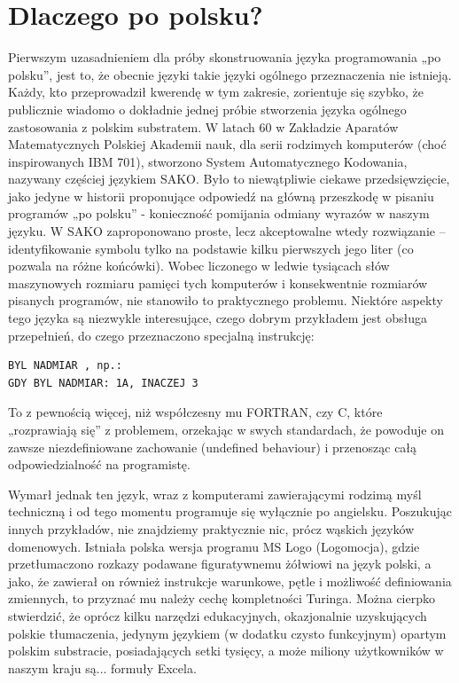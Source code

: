 \section{Dlaczego po polsku?}
Pierwszym uzasadnieniem dla próby skonstruowania języka programowania „po polsku”, jest to, że obecnie języki takie języki ogólnego przeznaczenia nie istnieją. Każdy, kto przeprowadził kwerendę w tym zakresie, zorientuje się szybko, że publicznie wiadomo o dokładnie jednej próbie stworzenia języka ogólnego zastosowania z polskim substratem.%
W latach 60 w Zakładzie Aparatów Matematycznych Polskiej Akademii nauk, dla serii rodzimych komputerów (choć inspirowanych IBM 701), stworzono System Automatycznego Kodowania, nazywany częściej językiem SAKO\cite{SAKO}. Było to niewątpliwie ciekawe przedsięwzięcie, jako jedyne w historii proponujące odpowiedź na główną przeszkodę w pisaniu programów „po polsku” - konieczność pomijania odmiany wyrazów w naszym języku. W SAKO zaproponowano proste, lecz akceptowalne wtedy rozwiązanie – identyfikowanie symbolu tylko na podstawie kilku pierwszych jego liter (co pozwala na różne końcówki). Wobec liczonego w ledwie tysiącach słów maszynowych rozmiaru pamięci tych komputerów i konsekwentnie rozmiarów pisanych programów, nie stanowiło to praktycznego problemu.
Niektóre aspekty tego języka są niezwykle interesujące, czego dobrym przykładem jest obsługa przepełnień, do czego przeznaczono specjalną instrukcję:
\begin{lstlisting}
BYL NADMIAR , np.:
GDY BYL NADMIAR: 1A, INACZEJ 3 
\end{lstlisting}
To z pewnością więcej, niż współczesny mu FORTRAN, czy C, które „rozprawiają się” z problemem, orzekając w swych standardach, że powoduje on zawsze niezdefiniowane zachowanie (undefined behaviour) i przenosząc całą odpowiedzialność na programistę.

Wymarł jednak ten język, wraz z komputerami zawierającymi rodzimą myśl techniczną i od tego momentu programuje się wyłącznie po angielsku.
Poszukując innych przykładów, nie znajdziemy praktycznie nic, prócz wąskich języków domenowych. Istniała polska wersja programu MS Logo (Logomocja), gdzie przetłumaczono rozkazy podawane figuratywnemu żółwiowi na język polski, a jako, że zawierał on również instrukcje warunkowe, pętle i możliwość definiowania zmiennych, to przyznać mu należy cechę kompletności Turinga. Można cierpko stwierdzić, że oprócz kilku narzędzi edukacyjnych, okazjonalnie uzyskujących polskie tłumaczenia, jedynym językiem (w dodatku czysto funkcyjnym) opartym polskim substracie, posiadających setki tysięcy, a może miliony użytkowników w naszym kraju są... formuły Excela.

